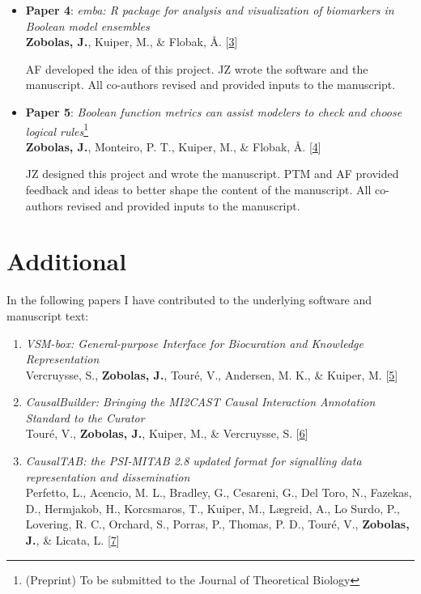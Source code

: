 \documentclass[
  12pt,
]{book}
\providecommand{\tightlist}{%
  \setlength{\itemsep}{0pt}\setlength{\parskip}{0pt}}
\begin{document}
\newpage

\hypertarget{Paper4}{}
\begin{itemize}
\item
  \textbf{Paper 4}: \emph{emba: R package for analysis and visualization of biomarkers in Boolean model ensembles}\\
  \textbf{Zobolas, J.}, Kuiper, M., \& Flobak, Å. {[}\protect\hyperlink{ref-Zobolas2020}{3}{]}

  AF developed the idea of this project. JZ wrote the software and the manuscript. All co-authors revised and provided inputs to the manuscript.
\end{itemize}

\hypertarget{Paper5}{}
\begin{itemize}
\item
  \textbf{Paper 5}: \emph{Boolean function metrics can assist modelers to check and choose logical rules}\footnote{(Preprint) To be submitted to the Journal of Theoretical Biology}\\
  \textbf{Zobolas, J.}, Monteiro, P. T., Kuiper, M., \& Flobak, Å. {[}\protect\hyperlink{ref-Zobolas2021-bias}{4}{]}

  JZ designed this project and wrote the manuscript. PTM and AF provided feedback and ideas to better shape the content of the manuscript. All co-authors revised and provided inputs to the manuscript.
\end{itemize}

\hypertarget{additional}{%
\section*{Additional}\label{additional}}

In the following papers I have contributed to the underlying software and manuscript text:

\begin{enumerate}
\def\labelenumi{\arabic{enumi}.}
\tightlist
\item
  \emph{VSM-box: General-purpose Interface for Biocuration and Knowledge Representation}\\
  Vercruysse, S., \textbf{Zobolas, J.}, Touré, V., Andersen, M. K., \& Kuiper, M. {[}\protect\hyperlink{ref-vsm-box}{5}{]}
\item
  \emph{CausalBuilder: Bringing the MI2CAST Causal Interaction Annotation Standard to the Curator}\\
  Touré, V., \textbf{Zobolas, J.}, Kuiper, M., \& Vercruysse, S. {[}\protect\hyperlink{ref-Toure2021}{6}{]}
\item
  \emph{CausalTAB: the PSI-MITAB 2.8 updated format for signalling data representation and dissemination}\\
  Perfetto, L., Acencio, M. L., Bradley, G., Cesareni, G., Del Toro, N., Fazekas, D., Hermjakob, H., Korcsmaros, T., Kuiper, M., Lægreid, A., Lo Surdo, P., Lovering, R. C., Orchard, S., Porras, P., Thomas, P. D., Touré, V., \textbf{Zobolas, J.}, \& Licata, L. {[}\protect\hyperlink{ref-Perfetto2019}{7}{]}
\end{enumerate}
\end{document}
